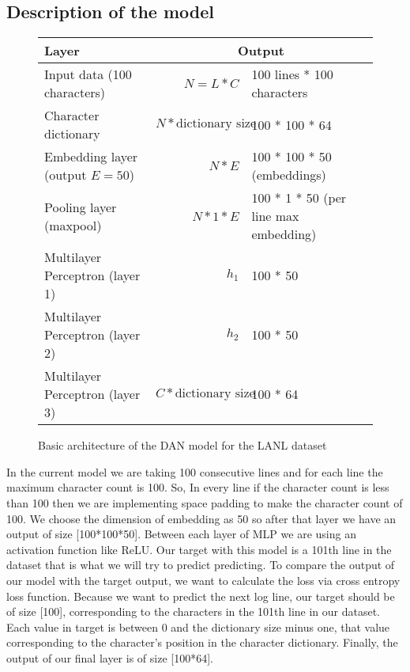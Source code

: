 \subsection{Description of the model}
\begin{figure}[H]
	\begin{center}
		\begin{tabularx}{.9\textwidth}{|l|r|X|}
			\hline 
			{\bfseries Layer} & \multicolumn{2}{|c|}{\bfseries Output} \\ 
			\hline 
			Input data (100 characters) &  $N = L * C$ & {100 lines * 100 characters} \\ 
			\hline 
			Character dictionary & $N * \text{dictionary size}$ & 100 * 100 * 64  \\ 
			\hline 
			Embedding layer (output $E=50$) & $N * E$ & 100 * 100 * 50 (embeddings) \\ 
			\hline 
			Pooling layer (maxpool) & $N * 1 * E$ & 100 * 1 * 50 (per line max embedding) \\ 
			\hline 
			Multilayer Perceptron (layer 1) & $h_1$ & 100 * 50 \\ 
			\hline 
			Multilayer Perceptron (layer 2) & $h_2$ & 100 * 50 \\ 
			\hline 
			Multilayer Perceptron (layer 3) & $C * \text{dictionary size}$ & 100 * 64 \\ 
			\hline 
		\end{tabularx} 
	\end{center}
	\caption{Basic architecture of the DAN model for the LANL dataset}
\end{figure} 

In the current model we are taking 100 consecutive lines and for each line the maximum character count is 100. So, In every line if the character count is less than 100 then  we are implementing space padding to make the character count of 100.
We choose the dimension of embedding as 50 so after that layer we have an output of size [100*100*50]. Between each layer of MLP we are using an activation function like ReLU.
Our target with this model is a 101th line in the dataset that is what we will try to predict predicting.
To compare the output of our model with the target output, we want to calculate the loss via cross entropy loss function.
Because we want to predict the next log line, our target should be of size [100], corresponding to the characters in the 101th line in our dataset. Each value in target is between 0 and the dictionary size minus one, that value corresponding to the character's position in the character dictionary. Finally, the output of our final layer is of size [100*64].


